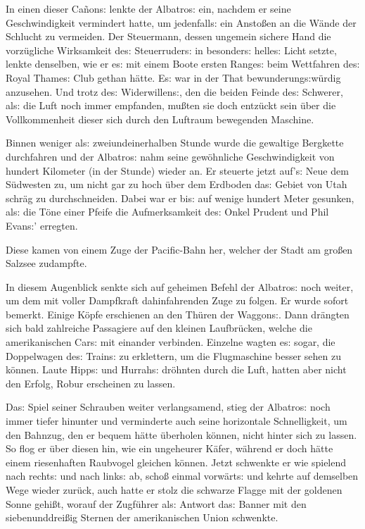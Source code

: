 \documentclass[oneside,12pt]{book}
\newcommand{\s}{s:}
\begin{document}
In einen dieser Ca\~non{\s} lenkte der {\glqq}Albatro{\s}{\grqq} ein,
nachdem er seine Geschwindigkeit vermindert hatte, um jedenfall{\s}
ein Ansto{\ss}en an die W\"ande der Schlucht zu vermeiden. Der
Steuermann, dessen ungemein sichere Hand die vorz\"ugliche
Wirksamkeit de{\s} Steuerruder{\s} in besonder{\s} helle{\s} Licht
setzte, lenkte denselben, wie er e{\s} mit einem Boote ersten
Range{\s} beim Wettfahren de{\s} Royal Thame{\s} Club gethan h\"atte.
E{\s} war in der That bewunderung{\s}w\"urdig anzusehen. Und trotz
de{\s} Widerwillen{\s}, den die beiden Feinde de{\s} {\glqq}Schwerer,
al{\s} die Luft{\grqq} noch immer empfanden, mu{\ss}ten sie doch
ent\/z\"uckt sein \"uber die Vollkommenheit dieser sich durch den
Luftraum bewegenden Maschine.

Binnen weniger al{\s} zweiundeinerhalben Stunde wurde die gewaltige
Bergkette durchfahren und der {\glqq}Albatro{\s}{\grqq} nahm seine
gew\"ohnliche Geschwindigkeit von hundert Kilometer (in der Stunde)
wieder an. Er steuerte jetzt auf'{\s} Neue dem S\"udwesten zu, um
nicht gar zu hoch \"uber dem Erdboden da{\s} Gebiet von Utah schr\"ag
zu durchschneiden. Dabei war er bi{\s} auf wenige hundert Meter
gesunken, al{\s} die T\"one einer Pfeife die Aufmerksamkeit de{\s}
Onkel Prudent und Phil Evan{\s}' erregten.

Diese kamen von einem Zuge der Pacific-Bahn her, welcher der Stadt am
gro{\ss}en Salzsee zudampfte.

In diesem Augenblick senkte sich auf geheimen Befehl der
{\glqq}Albatro{\s}{\grqq} noch weiter, um dem mit voller Dampfkraft
dahinfahrenden Zuge zu folgen. Er wurde sofort bemerkt. Einige
K\"opfe erschienen an den Th\"uren der Waggon{\s}. Dann dr\"angten
sich bald zahlreiche Passagiere auf den kleinen Laufbr\"ucken, welche
die amerikanischen {\glqq}Car{\s}{\grqq} mit einander verbinden.
Einzelne wagten e{\s} sogar, die Doppelwagen de{\s} Train{\s} zu
erklettern, um die Flugmaschine besser sehen zu k\"onnen. Laute
Hipp{\s} und Hurrah{\s} dr\"ohnten durch die Luft, hatten aber nicht
den Erfolg, Robur erscheinen zu lassen.

Da{\s} Spiel seiner Schrauben weiter verlangsamend, stieg der
{\glqq}Albatro{\s}{\grqq} noch immer tiefer hinunter und verminderte
auch seine horizontale Schnelligkeit, um den Bahnzug, den er bequem
h\"atte \"uberholen k\"onnen, nicht hinter sich zu lassen. So flog er
\"uber diesen hin, wie ein ungeheurer K\"afer, w\"ahrend er doch
h\"atte einem riesenhaften Raubvogel gleichen k\"onnen. Jetzt
schwenkte er wie spielend nach recht{\s} und nach link{\s} ab,
scho{\ss} einmal vorw\"art{\s} und kehrte auf demselben Wege wieder
zur\"uck, auch hatte er stolz die schwarze Flagge mit der goldenen
Sonne gehi{\ss}t, worauf der Zugf\"uhrer al{\s} Antwort da{\s} Banner
mit den siebenunddrei{\ss}ig Sternen der amerikanischen Union
schwenkte.
\end{document}
